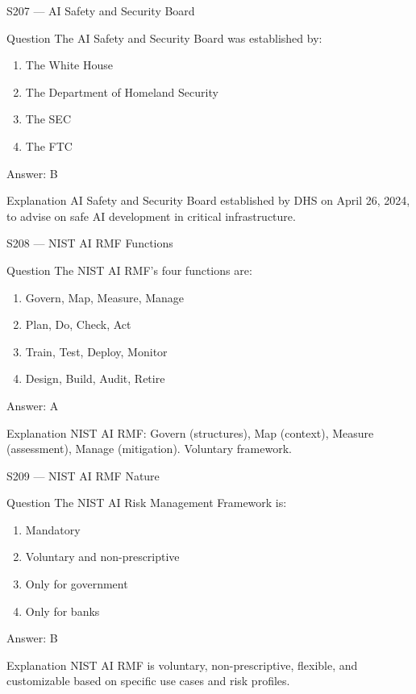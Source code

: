 \documentclass[aspectratio=169,8pt]{beamer}
\begin{document}
\begin{frame}{S207 --- AI Safety and Security Board}
	\begin{block}{Question}
		The AI Safety and Security Board was established by:
		\begin{enumerate}
			\item The White House
			\item The Department of Homeland Security
			\item The SEC
			\item The FTC
		\end{enumerate}
	\end{block}
	\begin{exampleblock}{Answer: B}\end{exampleblock}
	\begin{block}{Explanation}
		AI Safety and Security Board established by DHS on April 26, 2024, to advise on safe AI development in critical infrastructure.
	\end{block}
\end{frame}

\begin{frame}{S208 --- NIST AI RMF Functions}
	\begin{block}{Question}
		The NIST AI RMF's four functions are:
		\begin{enumerate}
			\item Govern, Map, Measure, Manage
			\item Plan, Do, Check, Act
			\item Train, Test, Deploy, Monitor
			\item Design, Build, Audit, Retire
		\end{enumerate}
	\end{block}
	\begin{exampleblock}{Answer: A}\end{exampleblock}
	\begin{block}{Explanation}
		NIST AI RMF: Govern (structures), Map (context), Measure (assessment), Manage (mitigation). Voluntary framework.
	\end{block}
\end{frame}

\begin{frame}{S209 --- NIST AI RMF Nature}
	\begin{block}{Question}
		The NIST AI Risk Management Framework is:
		\begin{enumerate}
			\item Mandatory
			\item Voluntary and non-prescriptive
			\item Only for government
			\item Only for banks
		\end{enumerate}
	\end{block}
	\begin{exampleblock}{Answer: B}\end{exampleblock}
	\begin{block}{Explanation}
		NIST AI RMF is voluntary, non-prescriptive, flexible, and customizable based on specific use cases and risk profiles.
	\end{block}
\end{frame}
\end{document}
